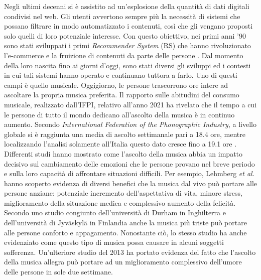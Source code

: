 \documentclass[11pt]{report}
\begin{document}
Negli ultimi decenni si è assistito ad un'esplosione della quantità di dati digitali condivisi nel web. Gli utenti avvertono sempre più la necessità di sistemi che possano filtrare in modo automatizzato i contenuti, così che gli vengano proposti solo quelli di loro potenziale interesse. Con questo obiettivo, nei primi anni '90 sono stati sviluppati i primi \textit{Recommender System} (RS) che hanno rivoluzionato l'e-commerce e la fruizione di contenuti da parte delle persone \cite{Konstan2012Apr}. Dal momento della loro nascita fino ai giorni d'oggi, sono stati diversi gli sviluppi ed i contesti in cui tali sistemi hanno operato e continuano tuttora a farlo. Uno di questi campi è quello musicale. 
Oggigiorno, le persone trascorrono ore intere ad ascoltare la propria musica preferita. Il rapporto sulle abitudini del consumo musicale, realizzato dall'IFPI, relativo all'anno 2021 ha rivelato che il tempo a cui le persone di tutto il mondo dedicano all'ascolto della musica è in continuo aumento. Secondo \emph{International Federation of the Phonographic Industry}, a livello globale si è raggiunta una media di ascolto settimanale pari a 18.4 ore, mentre localizzando l'analisi solamente all'Italia questo dato cresce fino a 19.1 ore \cite{BibEntry2022Feb}. Differenti studi hanno mostrato come l'ascolto della musica abbia un impatto decisivo sul cambiamento delle emozioni che le persone provano nel breve periodo e sulla loro capacità di affrontare situazioni difficili. Per esempio, Lehmberg \textit{et al.}\cite{Lehmberg2010BenefitsOM} hanno scoperto evidenza di diversi benefici che la musica dal vivo può portare alle persone anziane: potenziale incremento dell'aspettativa di vita, minore stress, miglioramento della situazione medica e complessivo aumento della felicità. Secondo uno studio congiunto dell'università di Durham in Inghilterra e dell'università di Jyväskylä in Finlandia \cite{Eerola2016Jun} anche la musica più triste può portare alle persone conforto e appagamento. Nonostante ciò, lo stesso studio ha anche evidenziato come questo tipo di musica possa causare in alcuni soggetti sofferenza. 
Un'ulteriore studio del 2013 \cite{Ferguson2013Jan} ha portato evidenza del fatto che l'ascolto della musica allegra può portare ad un miglioramento complessivo dell'umore delle persone in sole due settimane.\\

\newpage
\end{document}
